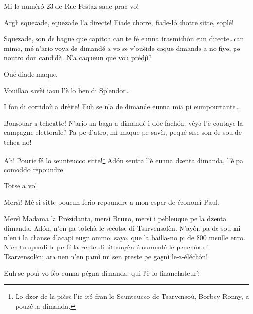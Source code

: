 \begin{drama}
\Fattorinospeaks Mi lo num\'er\'o 23 de Rue Festaz sade prao vo!

\Brunospeaks {} Argh squezade, squezade l'a directe!  Fiade chotre, fiade-l\'o chotre sitte, soplé!


\Brunospeaks {} Squezade, son de bague que capiton can te fé eunna trasmich\'on eun directe\ldots can mimo, mé n'ario voya de dimandé a vo se v'ouèide caque dimande a no fiye, pe noutro dou candidà. N'a caqueun que vou prédjì?


 \Brunospeaks {} Oué diade maque.

\SpectIspeaks Vouillao savèi iaou l'è lo ben di Splendor\ldots

\Brunospeaks I fon di corridoù a drèite! Euh se n'a de dimande eunna mia pi eumpourtante\ldots
 

\SpectIIspeaks Bonsouar a tcheutte! N'ario an baga a dimandé i doe fach\'on: véyo l'è coutaye la campagne elettorale? Pa pe d’atro, mi maque pe savèi, pequé sise son de sou de tcheu no!

\Brunospeaks Ah! Pourie fé lo seunteucco sitte!\footnote{ Lo dzor de la pièse l'ie it\'o fran lo Seunteucco de Tsarvensoù, Borbey Ronny, a pouzé la dimanda.}  Ad\'on seutta l'è eunna dzenta dimanda, l'è pa comoddo repoundre. 


\Brunospeaks {} Totse a vo!

\Presidanspeaks Mersì! Mé si sitte poueun ferio repoundre a mon esper de économì Paul.

\Dallasspeaks {} Mersì Madama la Prézidanta, mersì Bruno, mersì i pebleuque pe la dzenta dimanda. Ad\'on, n'en pa totchà le secotse di Tsarvensolèn. N'ayòn pa de sou mi n'en i la chanse d'acapì eugn ommo, sayo, que la bailla-no pi de 800 meulle euro. N'en to spendi-le pe fé la rente di sitouayèn é aumenté le pench\'on di Tsarvensolèn; ara nen n'en pamì mi sen preste pe gagnì le-z-éléch\'on!

\Brunospeaks Euh se pouì vo féo eunna pégna dimanda: qui l'è lo financhateur?


\end{drama}
